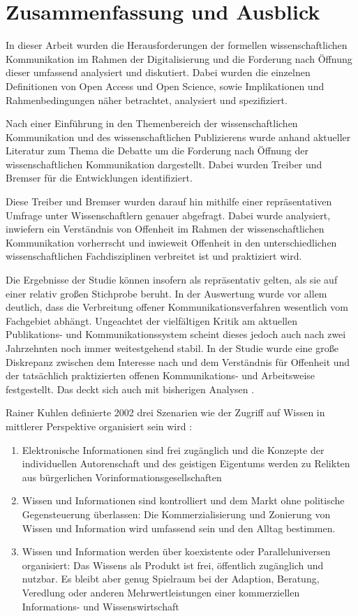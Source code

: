\chapter{Zusammenfassung und Ausblick}

In dieser Arbeit wurden die Herausforderungen der formellen wissenschaftlichen Kommunikation im Rahmen der Digitalisierung und die Forderung nach Öffnung dieser umfassend analysiert und diskutiert. Dabei wurden die einzelnen Definitionen von Open Access und Open Science, sowie Implikationen und Rahmenbedingungen näher betrachtet, analysiert und spezifiziert.

Nach einer Einführung in den Themenbereich der wissenschaftlichen Kommunikation und des wissenschaftlichen Publizierens wurde anhand aktueller Literatur zum Thema die Debatte um die Forderung nach Öffnung der wissenschaftlichen Kommunikation dargestellt. Dabei wurden Treiber und Bremser für die Entwicklungen identifiziert.

Diese Treiber und Bremser wurden darauf hin mithilfe einer repräsentativen Umfrage unter Wissenschaftlern genauer abgefragt. Dabei wurde analysiert, inwiefern ein Verständnis von Offenheit im Rahmen der wissenschaftlichen Kommunikation vorherrscht und inwieweit Offenheit in den unterschiedlichen wissenschaftlichen Fachdisziplinen verbreitet ist und praktiziert wird.

Die Ergebnisse der Studie können insofern als repräsentativ gelten, als sie auf einer relativ großen Stichprobe beruht. In der Auswertung wurde vor allem deutlich, dass die Verbreitung offener Kommunikationsverfahren wesentlich vom Fachgebiet abhängt. Ungeachtet der vielfältigen Kritik am aktuellen Publikations- und Kommunikationssystem scheint dieses jedoch auch nach zwei Jahrzehnten noch immer weitestgehend stabil. In der Studie wurde eine große Diskrepanz zwischen dem Interesse nach und dem Verständnis für Offenheit und der tatsächlich praktizierten offenen Kommunikations- und Arbeitsweise festgestellt. Das deckt sich auch mit bisherigen Analysen \cite{Bartling_2013} \cite{hagner_2015_sache_buches}.

Rainer Kuhlen definierte 2002 drei Szenarien wie der Zugriff auf Wissen in mittlerer Perspektive organisiert sein wird \cite{Kuhlen_2002_universalaccess}:
\begin{enumerate}
\item Elektronische Informationen sind frei zugänglich und die Konzepte der individuellen Autorenschaft und des geistigen Eigentums werden zu Relikten aus bürgerlichen Vorinformationsgesellschaften
\item Wissen und Informationen sind kontrolliert und dem Markt ohne politische Gegensteuerung überlassen: Die Kommerzialisierung und Zonierung von Wissen und Information wird umfassend sein und den Alltag bestimmen.
\item Wissen und Information werden über koexistente oder Paralleluniversen organisiert: Das Wissens als Produkt ist frei, öffentlich zugänglich und nutzbar. Es bleibt aber genug Spielraum bei der Adaption, Beratung, Veredlung oder anderen Mehrwertleistungen einer kommerziellen Informations- und Wissenswirtschaft
\end{enumerate}

